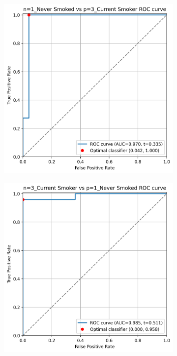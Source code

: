 \documentclass[draft]{article} %
\begin{document}
\begin{figure}[p]
    \centering
    \begin{subfigure}{0.46\linewidth}
        \centering
        \includegraphics[width=\linewidth]{cohort1/test_1v3_roc.png}
    \end{subfigure}
    \hspace{4mm}
    \begin{subfigure}{0.46\linewidth}
        \centering
        \includegraphics[width=\linewidth]{cohort1/test_3v1_roc.png}
    \end{subfigure}


\end{figure}
\end{document}
